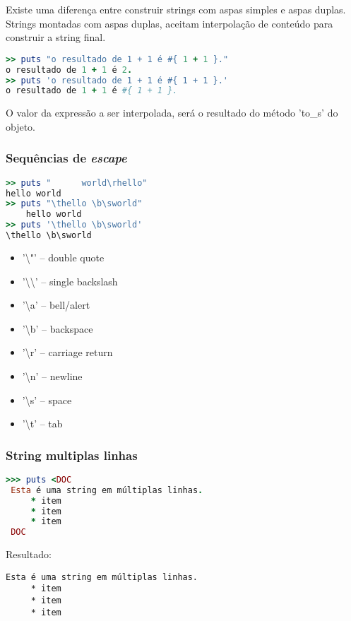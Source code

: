 \documentclass[serif,mathserif]{article}
\begin{document}
Existe uma diferença entre construir strings com aspas simples e aspas duplas. Strings montadas com aspas duplas, aceitam interpolação de conteúdo para construir a string final.

\begin{lstlisting}[language=ruby]
>> puts "o resultado de 1 + 1 é #{ 1 + 1 }."
o resultado de 1 + 1 é 2.
>> puts 'o resultado de 1 + 1 é #{ 1 + 1 }.'
o resultado de 1 + 1 é #{ 1 + 1 }.
\end{lstlisting}

O valor da expressão a ser interpolada, será o resultado do método 'to\_s' do objeto.

\subsubsection{Sequências de \em{escape}}

\begin{lstlisting}[language=ruby]
>> puts "      world\rhello"
hello world
>> puts "\thello \b\sworld"
    hello world
>> puts '\thello \b\sworld'
\thello \b\sworld
\end{lstlisting}

\begin{itemize}
  \item  '\textbackslash"' – double quote
  \item  '\textbackslash\textbackslash' – single backslash
  \item  '\textbackslash{}a' – bell/alert
  \item  '\textbackslash{}b' – backspace
  \item  '\textbackslash{}r' – carriage return
  \item  '\textbackslash{}n' – newline
  \item  '\textbackslash{}s' – space
  \item  '\textbackslash{}t' – tab
\end{itemize}


\subsubsection{String multiplas linhas}

\begin{lstlisting}[language=ruby]
>>> puts <DOC
 Esta é uma string em múltiplas linhas.
     * item
     * item
     * item
 DOC
\end{lstlisting}

Resultado:
\begin{lstlisting}[style=BashOutputStyle]
 Esta é uma string em múltiplas linhas.
     * item
     * item
     * item
\end{lstlisting}
\end{document}
